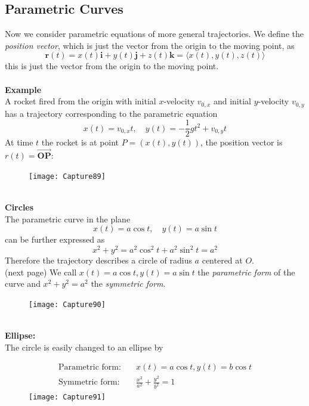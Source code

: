 \documentclass{report}
\begin{document}
\subsection{Parametric Curves} %
Now we consider parametric equations of more general trajectories. We define the 
\textit{position vector}, which is just the vector from the origin to the moving point, as 
\begin{equation*}
\mathbf{r}(t)=x(t)\mathbf{i}+y(t)\mathbf{j}+
z(t)\mathbf{k}=\langle x(t),y(t),z(t)\rangle
\end{equation*}
this is just the vector from the origin to the moving point.\\
\vspace{1mm}\\
\textbf{Example}\\
A rocket fired from the origin with initial $x$-velocity $v_{0,x}$ and initial 
$y$-velocity $v_{0,y}$ has a trajectory corresponding to the parametric equation
\begin{equation*}
x(t)=v_{0,x}t,\quad y(t)=-\frac{1}{2}gt^2+v_{0,y}t
\end{equation*}
At time $t$ the rocket is at point $P=(x(t),y(t))$, the position vector is $r(t)
=\overrightarrow{\mathbf{OP}}$:
\begin{figure}[h]
\texttt{[image: Capture89]}\\
\centering
\end{figure}\\
\textbf{Circles}\\
The parametric curve in the plane
\begin{equation*}
x(t)=a\cos t,\quad y(t)=a\sin t
\end{equation*}
can be further expressed as 
\begin{equation*}
x^2+y^2=a^2\cos^2t+a^2\sin^2t=a^2
\end{equation*}
Therefore the trajectory describes a circle of radius $a$ centered at $O$.\\
(next page)
\newpage
\noindent We call $x(t)=a\cos t,y(t)=a\sin t$ the \textit{parametric form} of the curve and 
$x^2+y^2=a^2$ the \textit{symmetric form}. 
\begin{figure}[h]
\texttt{[image: Capture90]}\\
\centering
\end{figure}\\
\textbf{Ellipse:}\\
The circle is easily changed to an ellipse by
\begin{figure}[h]
\begin{align*}
\text{Parametric form:}&\quad x(t)=a\cos t,y(t)=b\cos t\\
\text{Symmetric form:}&\quad\frac{x^2}{a^2}+\frac{y^2}{b^2}=1
\end{align*}
\texttt{[image: Capture91]}\\
\centering
\end{figure}
\newpage
\end{document}
